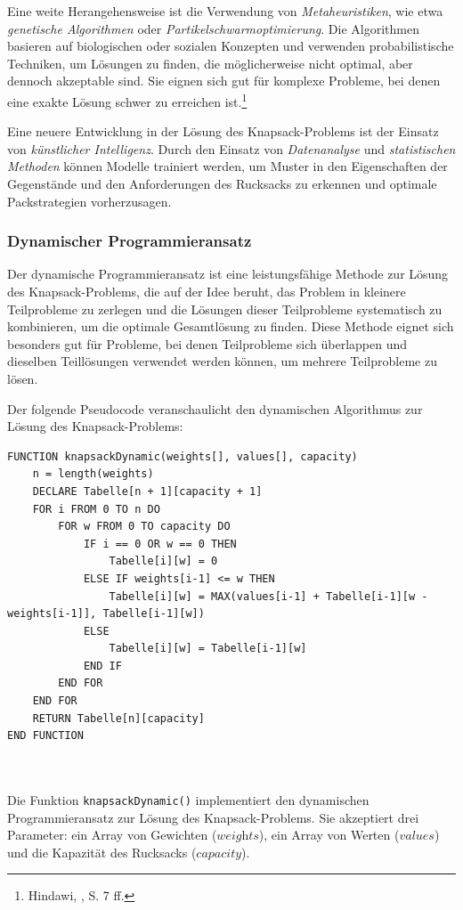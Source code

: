 \begin{itemize}
Eine weite Herangehensweise ist die Verwendung von \textit{Metaheuristiken}, wie etwa \textit{genetische Algorithmen}
oder \textit{Partikelschwarmoptimierung}. Die Algorithmen basieren auf biologischen oder sozialen Konzepten und verwenden
probabilistische Techniken, um Lösungen zu finden, die möglicherweise nicht optimal, aber dennoch akzeptable sind. Sie
eignen sich gut für komplexe Probleme, bei denen eine exakte Lösung schwer zu erreichen ist.\footnote{Hindawi, \cite{Solving the 0/1 Knapsack Problem Using Metaheuristic and Neural Networks}, S. 7 ff.}

Eine neuere Entwicklung in der Lösung des Knapsack-Problems ist der Einsatz von \textit{künstlicher Intelligenz}. Durch
den Einsatz von \textit{Datenanalyse} und \textit{statistischen Methoden} können Modelle trainiert werden, um Muster in
den Eigenschaften der Gegenstände und den Anforderungen des  Rucksacks zu erkennen und optimale Packstrategien vorherzusagen.

\subsubsection{Dynamischer Programmieransatz}
Der dynamische Programmieransatz ist eine leistungsfähige Methode zur Lösung des Knapsack-Problems, die auf der Idee beruht,
das Problem in kleinere Teilprobleme zu zerlegen und die Lösungen dieser Teilprobleme systematisch zu kombinieren, um die
optimale Gesamtlösung zu finden. Diese Methode eignet sich besonders gut für Probleme, bei denen Teilprobleme sich überlappen
und dieselben Teillösungen verwendet werden können, um mehrere Teilprobleme zu lösen.

Der folgende Pseudocode veranschaulicht den dynamischen Algorithmus zur Lösung des Knapsack-Problems:
\begin{lstlisting}[style=csharp, caption={Dynamischer Algorithmus}]
FUNCTION knapsackDynamic(weights[], values[], capacity)
    n = length(weights)
    DECLARE Tabelle[n + 1][capacity + 1]
    FOR i FROM 0 TO n DO
        FOR w FROM 0 TO capacity DO
            IF i == 0 OR w == 0 THEN
                Tabelle[i][w] = 0
            ELSE IF weights[i-1] <= w THEN
                Tabelle[i][w] = MAX(values[i-1] + Tabelle[i-1][w - weights[i-1]], Tabelle[i-1][w])
            ELSE
                Tabelle[i][w] = Tabelle[i-1][w]
            END IF
        END FOR
    END FOR
    RETURN Tabelle[n][capacity]
END FUNCTION
\end{lstlisting}\\
\\
Die Funktion \texttt{knapsackDynamic()} implementiert den dynamischen Programmieransatz zur Lösung des Knapsack-Problems.
Sie akzeptiert drei Parameter: ein Array von Gewichten (\( \textit{weights} \)), ein Array von Werten (\( \textit{values} \))
und die Kapazität des Rucksacks (\( \textit{capacity} \)).


\end{itemize}
